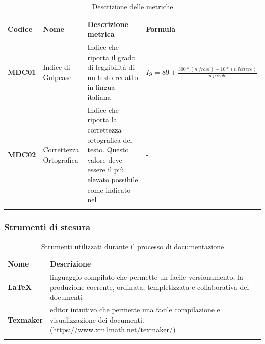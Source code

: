 {{{
	\setlength{\freewidth}{\dimexpr\textwidth-0\tabcolsep}
	\renewcommand{\arraystretch}{1.5}
	\setlength{\aboverulesep}{0pt}
	\setlength{\belowrulesep}{0pt}
	\begin{longtable}{L{.1\freewidth} L{.15\freewidth} L{.3\freewidth} L{.35\freewidth}}
		\toprule 
		\textbf{Codice} & \textbf{Nome} & \textbf{Descrizione metrica} & \textbf{Formula}\\
		\toprule
		\endhead		
		\textbf{MDC01} & Indice di Gulpease & Indice che riporta il grado di leggibilità di un testo redatto in lingua italiana & \small{$Ig= 89 + \frac{300 * (n\ frasi) - 10 * (n\ lettere)}{n\ parole}$} \\
		\textbf{MDC02} & Correttezza Ortografica & Indice che riporta la correttezza ortografica del testo. Questo valore deve essere il più elevato possibile come indicato nel \PdQ{} & - \\
		
		\bottomrule
		\hiderowcolors
		\caption{Descrizione delle metriche}\\
	\end{longtable}
}


\subsubsection{Strumenti di stesura}

	\setlength{\freewidth}{\dimexpr\textwidth-1\tabcolsep}
	\renewcommand{\arraystretch}{1.5}
	\setlength{\aboverulesep}{0pt}
	\setlength{\belowrulesep}{0pt}
	\begin{longtable}{L{.210\freewidth} L{.75\freewidth} L{.080\freewidth}}
		\toprule 
		\textbf{Nome} & \textbf{Descrizione} \\
		\toprule
		\endhead		
		\textbf{\LaTeX} & linguaggio compilato che permette un facile versionamento, la produzione coerente, ordinata, templetizzata e collaborativa dei documenti \\
		\textbf{Texmaker} & editor intuitivo che permette una facile compilazione e visualizzazione dei documenti. \newline \url{(https://www.xm1math.net/texmaker/)}\\
		\bottomrule
		\hiderowcolors
		\caption{Strumenti utilizzati durante il processo di documentazione}
	\end{longtable}

}}
